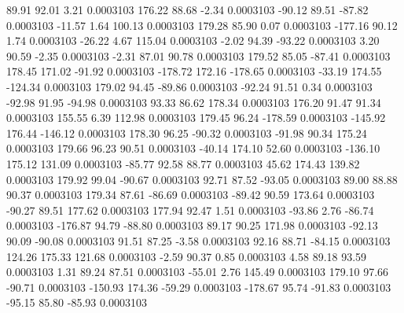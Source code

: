        89.91       92.01        3.21     0.0003103
      176.22       88.68       -2.34     0.0003103
      -90.12       89.51      -87.82     0.0003103
      -11.57        1.64      100.13     0.0003103
      179.28       85.90        0.07     0.0003103
     -177.16       90.12        1.74     0.0003103
      -26.22        4.67      115.04     0.0003103
       -2.02       94.39      -93.22     0.0003103
        3.20       90.59       -2.35     0.0003103
       -2.31       87.01       90.78     0.0003103
      179.52       85.05      -87.41     0.0003103
      178.45      171.02      -91.92     0.0003103
     -178.72      172.16     -178.65     0.0003103
      -33.19      174.55     -124.34     0.0003103
      179.02       94.45      -89.86     0.0003103
      -92.24       91.51        0.34     0.0003103
      -92.98       91.95      -94.98     0.0003103
       93.33       86.62      178.34     0.0003103
      176.20       91.47       91.34     0.0003103
      155.55        6.39      112.98     0.0003103
      179.45       96.24     -178.59     0.0003103
     -145.92      176.44     -146.12     0.0003103
      178.30       96.25      -90.32     0.0003103
      -91.98       90.34      175.24     0.0003103
      179.66       96.23       90.51     0.0003103
      -40.14      174.10       52.60     0.0003103
     -136.10      175.12      131.09     0.0003103
      -85.77       92.58       88.77     0.0003103
       45.62      174.43      139.82     0.0003103
      179.92       99.04      -90.67     0.0003103
       92.71       87.52      -93.05     0.0003103
       89.00       88.88       90.37     0.0003103
      179.34       87.61      -86.69     0.0003103
      -89.42       90.59      173.64     0.0003103
      -90.27       89.51      177.62     0.0003103
      177.94       92.47        1.51     0.0003103
      -93.86        2.76      -86.74     0.0003103
     -176.87       94.79      -88.80     0.0003103
       89.17       90.25      171.98     0.0003103
      -92.13       90.09      -90.08     0.0003103
       91.51       87.25       -3.58     0.0003103
       92.16       88.71      -84.15     0.0003103
      124.26      175.33      121.68     0.0003103
       -2.59       90.37        0.85     0.0003103
        4.58       89.18       93.59     0.0003103
        1.31       89.24       87.51     0.0003103
      -55.01        2.76      145.49     0.0003103
      179.10       97.66      -90.71     0.0003103
     -150.93      174.36      -59.29     0.0003103
     -178.67       95.74      -91.83     0.0003103
      -95.15       85.80      -85.93     0.0003103
